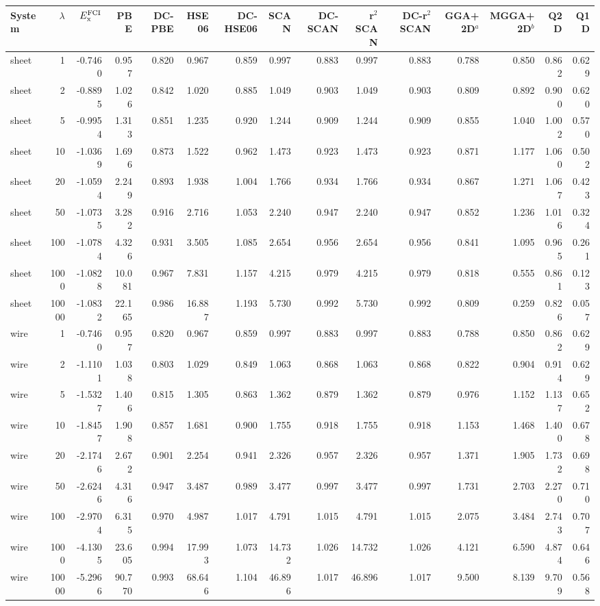 \begin{tabular}{lrrrrrrrrrrrrrr}
\toprule
System & $\lambda$ & $E_{\rm x}^{\rm FCI}$ & PBE & DC-PBE & HSE06 & DC-HSE06 & SCAN & DC-SCAN & r$^2$SCAN & DC-r$^2$SCAN & GGA+2D$^a$ & MGGA+2D$^b$ & Q2D & Q1D \\
\midrule
sheet & 1 & -0.7460 & 0.957 & 0.820 & 0.967 & 0.859 & 0.997 & 0.883 & 0.997 & 0.883 & 0.788 & 0.850 & 0.862 & 0.629 \\
sheet & 2 & -0.8895 & 1.026 & 0.842 & 1.020 & 0.885 & 1.049 & 0.903 & 1.049 & 0.903 & 0.809 & 0.892 & 0.900 & 0.620 \\
sheet & 5 & -0.9954 & 1.313 & 0.851 & 1.235 & 0.920 & 1.244 & 0.909 & 1.244 & 0.909 & 0.855 & 1.040 & 1.002 & 0.570 \\
sheet & 10 & -1.0369 & 1.696 & 0.873 & 1.522 & 0.962 & 1.473 & 0.923 & 1.473 & 0.923 & 0.871 & 1.177 & 1.060 & 0.502 \\
sheet & 20 & -1.0594 & 2.249 & 0.893 & 1.938 & 1.004 & 1.766 & 0.934 & 1.766 & 0.934 & 0.867 & 1.271 & 1.067 & 0.423 \\
sheet & 50 & -1.0735 & 3.282 & 0.916 & 2.716 & 1.053 & 2.240 & 0.947 & 2.240 & 0.947 & 0.852 & 1.236 & 1.016 & 0.324 \\
sheet & 100 & -1.0784 & 4.326 & 0.931 & 3.505 & 1.085 & 2.654 & 0.956 & 2.654 & 0.956 & 0.841 & 1.095 & 0.965 & 0.261 \\
sheet & 1000 & -1.0828 & 10.081 & 0.967 & 7.831 & 1.157 & 4.215 & 0.979 & 4.215 & 0.979 & 0.818 & 0.555 & 0.861 & 0.123 \\
sheet & 10000 & -1.0832 & 22.165 & 0.986 & 16.887 & 1.193 & 5.730 & 0.992 & 5.730 & 0.992 & 0.809 & 0.259 & 0.826 & 0.057 \\
\midrule
wire & 1 & -0.7460 & 0.957 & 0.820 & 0.967 & 0.859 & 0.997 & 0.883 & 0.997 & 0.883 & 0.788 & 0.850 & 0.862 & 0.629 \\
wire & 2 & -1.1101 & 1.038 & 0.803 & 1.029 & 0.849 & 1.063 & 0.868 & 1.063 & 0.868 & 0.822 & 0.904 & 0.914 & 0.629 \\
wire & 5 & -1.5327 & 1.406 & 0.815 & 1.305 & 0.863 & 1.362 & 0.879 & 1.362 & 0.879 & 0.976 & 1.152 & 1.137 & 0.652 \\
wire & 10 & -1.8457 & 1.908 & 0.857 & 1.681 & 0.900 & 1.755 & 0.918 & 1.755 & 0.918 & 1.153 & 1.468 & 1.400 & 0.678 \\
wire & 20 & -2.1746 & 2.672 & 0.901 & 2.254 & 0.941 & 2.326 & 0.957 & 2.326 & 0.957 & 1.371 & 1.905 & 1.732 & 0.698 \\
wire & 50 & -2.6246 & 4.316 & 0.947 & 3.487 & 0.989 & 3.477 & 0.997 & 3.477 & 0.997 & 1.731 & 2.703 & 2.270 & 0.710 \\
wire & 100 & -2.9704 & 6.315 & 0.970 & 4.987 & 1.017 & 4.791 & 1.015 & 4.791 & 1.015 & 2.075 & 3.484 & 2.743 & 0.707 \\
wire & 1000 & -4.1305 & 23.605 & 0.994 & 17.993 & 1.073 & 14.732 & 1.026 & 14.732 & 1.026 & 4.121 & 6.590 & 4.874 & 0.646 \\
wire & 10000 & -5.2966 & 90.770 & 0.993 & 68.646 & 1.104 & 46.896 & 1.017 & 46.896 & 1.017 & 9.500 & 8.139 & 9.709 & 0.568 \\
\bottomrule
\end{tabular}
